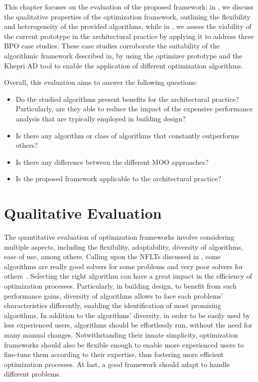 \label{chap:evaluation}
 
This chapter focuses on the evaluation of the proposed framework: in , we discuss the qualitative properties of the optimization framework, outlining the flexibility and heterogeneity of the provided algorithms, while in , we assess the viability of the current prototype in the architectural practice by applying it to address three \ac{BPO} case studies. These case studies corroborate the suitability of the algorithmic framework described in, by using the optimizer prototype and the Khepri \ac{AD} tool to enable the application of different optimization algorithms. 

Overall, this evaluation aims to answer the following questions: 
\begin{itemize}
	\item Do the studied algorithms present benefits for the architectural practice? Particularly, are they able to reduce the impact of the expensive performance analysis that are typically employed in building design?
	\item Is there any algorithm or class of algorithms that constantly outperforms others?
	\item Is there any difference between the different \ac{MOO} approaches? 
	\item Is the proposed framework applicable to the architectural practice? 
\end{itemize}

\section{Qualitative Evaluation}
\label{sec:qualitative}
The quantitative evaluation of optimization frameworks involve considering multiple aspects, including the flexibility, adaptability, diversity of algorithms, ease of use, among others. Calling upon the \acp{NFLT} discussed in , some algorithms are really good solvers for some problems and very poor solvers for others~\cite{Wolpert1997NFLT}. Selecting the right algorithm can have a great impact in the efficiency of optimization processes. Particularly, in building design, to benefit from such performance gains, diversity of algorithms allows to face each problems' characteristics differently, enabling the identification of most promising algorithms. In addition to the algorithms' diversity, in order to be easily used by less experienced users, algorithms should be effortlessly run, without the need for many manual changes. Notwithstanding their innate simplicity, optimization frameworks should also be flexible enough to enable more experienced users to fine-tune them according to their expertise, thus fostering more efficient optimization processes. At last, a good framework should adapt to handle different problems.

